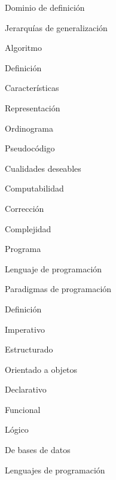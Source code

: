 \begin{longenum}
\begin{longenum}
\begin{longenum}
\begin{longenum}
                \item Dominio de definición
                \item Jerarquías de generalización
            \end{longenum}
            \item Algoritmo
            \begin{longenum}
                \item Definición
                \item Características
                \item Representación
                \begin{longenum}
                    \item Ordinograma
                    \item Pseudocódigo
                \end{longenum}
                \item Cualidades deseables
                \item Computabilidad
                \item Corrección
                \item Complejidad
            \end{longenum}
            \item Programa
            \item Lenguaje de programación
        \end{longenum}
        \item Paradigmas de programación
        \begin{longenum}
            \item Definición
            \item Imperativo
            \begin{longenum}
                \item Estructurado
                \item Orientado a objetos
            \end{longenum}
            \item Declarativo
            \begin{longenum}
                \item Funcional
                \item Lógico
                \item De bases de datos
            \end{longenum}
        \end{longenum}
        \item Lenguajes de programación

\end{longenum}
\end{longenum}
